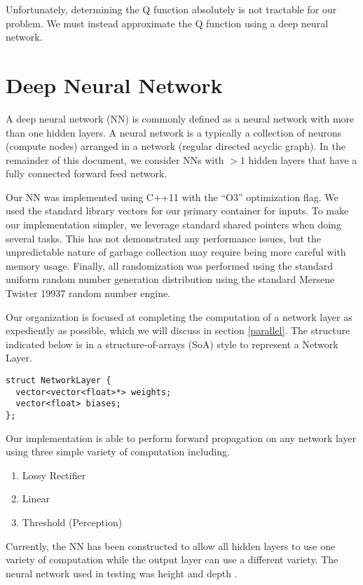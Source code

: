 Unfortunately, determining the Q function absolutely is not tractable for our problem.
We must instead approximate the Q function using a deep neural network.

\section*{Deep Neural Network}
A deep neural network (NN) is commonly defined as a neural network with more than one hidden layers.
A neural network is a typically a collection of neurons (compute nodes) arranged in a network (regular directed acyclic graph).
In the remainder of this document, we consider NNs with $>1$ hidden layers that have a fully connected forward feed network.

Our NN was implemented using C++11 with the ``O3'' optimization flag.
We used the standard library vectors for our primary container for inputs.
To make our implementation simpler, we leverage standard shared pointers when doing several tasks.
This has not demonstrated any performance issues, but the unpredictable nature of garbage collection may require being more careful with memory usage.
Finally, all randomization was performed using the standard uniform random number generation distribution using the standard Mersene Twister 19937 random number engine.

Our organization is focused at completing the computation of a network layer as expediently as possible, which we will discuss in section \ref{parallel}.
The structure indicated below is in a structure-of-arrays (SoA) style to represent a Network Layer.

\begin{lstlisting}
struct NetworkLayer {
  vector<vector<float>*> weights;
  vector<float> biases;
};
\end{lstlisting}

Our implementation is able to perform forward propagation on any network layer using three simple variety of computation including.
\begin{enumerate}
\item Lossy Rectifier
\item Linear
\item Threshold (Perception)
\end{enumerate}
Currently, the NN has been constructed to allow all hidden layers to use one variety of computation while the output layer can use a different variety.
The neural network used in testing was height \netheight and depth \netdepth.

